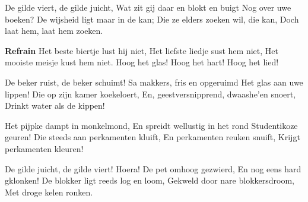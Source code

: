 \footnotemark [
ititle={Gilde viert, de}]


\beginverse
De gilde viert, de gilde juicht,
Wat zit gij daar en blokt en buigt
Nog over uwe boeken?
De wijsheid ligt maar in de kan;
Die ze elders zoeken wil, die kan,
Doch laat hem, laat hem zoeken.
\endverse

\beginchorus
\textbf{Refrain}
Het beste biertje lust hij niet,
Het liefste liedje sust hem niet,
Het mooiste meisje kust hem niet.
Hoog het glas! Hoog het hart! Hoog het lied!
\endchorus

\beginverse
De beker ruist, de beker schuimt!
Sa makkers, fris en opgeruimd
Het glas aan uwe lippen!
Die op zijn kamer koekeloert,
En, geestversnipprend, dwaashe'en snoert,
Drinkt water als de kippen!
\endverse

\beginverse
Het pijpke dampt in monkelmond,
En spreidt wellustig in het rond
Studentikoze geuren!
Die steeds aan perkamenten kluift,
En perkamenten reuken snuift,
Krijgt perkamenten kleuren!
\endverse

\beginverse
De gilde juicht, de gilde viert!
Hoera! De pet omhoog gezwierd,
En nog eens hard gklonken!
De blokker ligt reeds log en loom,
Gekweld door nare blokkersdroom,
Met droge kelen ronken.
\endverse
\endsong